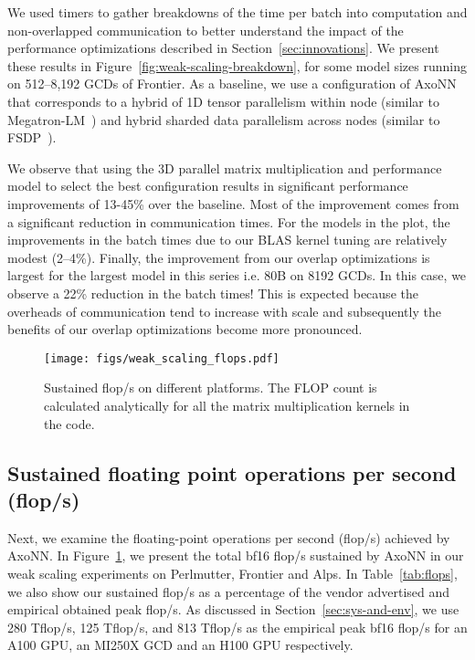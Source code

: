 We used timers to gather breakdowns of the time per batch into computation and
non-overlapped communication to better understand the impact of the performance
optimizations described in Section~\ref{sec:innovations}.  We present these
results in Figure~\ref{fig:weak-scaling-breakdown}, for some model sizes
running on 512--8,192 GCDs of Frontier.  As a baseline, we use a configuration
of AxoNN that corresponds to a hybrid of 1D tensor parallelism within node
(similar to Megatron-LM~\cite{megatronlm}) and hybrid sharded data parallelism
across nodes (similar to FSDP~\cite{fsdp,wang2023zero}).

We observe that using the 3D parallel matrix multiplication and performance
model to select the best configuration results in significant performance
improvements of 13-45\% over the baseline.  Most of the improvement comes from
a significant reduction in communication times. For the models in the plot, the
improvements in the batch times due to our BLAS kernel tuning are relatively
modest (2--4\%). Finally, the improvement from our overlap optimizations is
largest for the largest model in this series i.e.  80B on 8192 GCDs. In this
case, we observe a 22\% reduction in the batch times!  This is expected because
the overheads of communication tend to increase with scale and subsequently the
benefits of our overlap optimizations become more pronounced.

\begin{figure}[h]
  \centering
    \texttt{[image: figs/weak\_scaling\_flops.pdf]}
    \caption{Sustained flop/s on different platforms. The FLOP count
is calculated analytically for all the matrix multiplication kernels in the
code.}
\label{fig:flops}
\end{figure}

\subsection{Sustained floating point operations per second (flop/s)}

Next, we examine the floating-point operations per second (flop/s) achieved by
AxoNN. In Figure~\ref{fig:flops}, we present the total bf16 flop/s sustained by
AxoNN in our weak scaling experiments on Perlmutter, Frontier and Alps. In
Table~\ref{tab:flops}, we also show our sustained flop/s as a percentage of the
vendor advertised and empirical obtained peak flop/s. As discussed in
Section~\ref{sec:sys-and-env}, we use 280 Tflop/s, 125 Tflop/s, and 813 Tflop/s
as the empirical peak bf16 flop/s for an A100 GPU, an MI250X GCD and an H100
GPU respectively.

